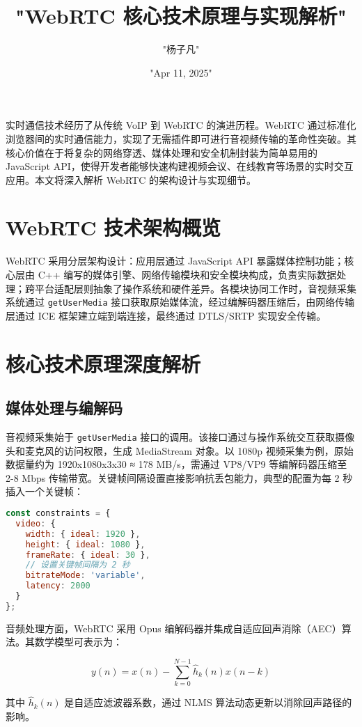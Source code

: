 \title{"WebRTC 核心技术原理与实现解析"}
\author{"杨子凡"}
\date{"Apr 11, 2025"}
\maketitle
实时通信技术经历了从传统 VoIP 到 WebRTC 的演进历程。WebRTC 通过标准化浏览器间的实时通信能力，实现了无需插件即可进行音视频传输的革命性突破。其核心价值在于将复杂的网络穿透、媒体处理和安全机制封装为简单易用的 JavaScript API，使得开发者能够快速构建视频会议、在线教育等场景的实时交互应用。本文将深入解析 WebRTC 的架构设计与实现细节。\par
\chapter{WebRTC 技术架构概览}
WebRTC 采用分层架构设计：应用层通过 JavaScript API 暴露媒体控制功能；核心层由 C++ 编写的媒体引擎、网络传输模块和安全模块构成，负责实际数据处理；跨平台适配层则抽象了操作系统和硬件差异。各模块协同工作时，音视频采集系统通过 \verb!getUserMedia! 接口获取原始媒体流，经过编解码器压缩后，由网络传输层通过 ICE 框架建立端到端连接，最终通过 DTLS/SRTP 实现安全传输。\par
\chapter{核心技术原理深度解析}
\section{媒体处理与编解码}
音视频采集始于 \verb!getUserMedia! 接口的调用。该接口通过与操作系统交互获取摄像头和麦克风的访问权限，生成 MediaStream 对象。以 1080p 视频采集为例，原始数据量约为 1920x1080x3x30 ≈ 178 MB/s，需通过 VP8/VP9 等编解码器压缩至 2-8 Mbps 传输带宽。关键帧间隔设置直接影响抗丢包能力，典型的配置为每 2 秒插入一个关键帧：\par
\begin{lstlisting}[language=javascript]
const constraints = {
  video: {
    width: { ideal: 1920 },
    height: { ideal: 1080 },
    frameRate: { ideal: 30 },
    // 设置关键帧间隔为 2 秒
    bitrateMode: 'variable',
    latency: 2000 
  }
};
\end{lstlisting}
音频处理方面，WebRTC 采用 Opus 编解码器并集成自适应回声消除（AEC）算法。其数学模型可表示为：\par
$$ y(n) = x(n) - \sum_{k=0}^{N-1} \hat{h}_k(n) x(n-k) $$\par
其中 $\hat{h}_k(n)$ 是自适应滤波器系数，通过 NLMS 算法动态更新以消除回声路径的影响。\par
